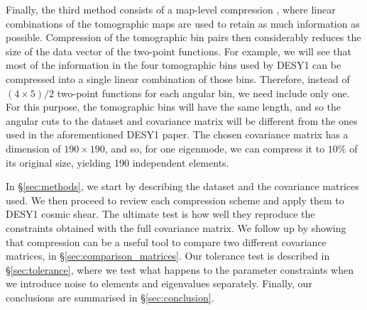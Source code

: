 \documentclass[twocolumn]{\docclass}
\newcommand{\rsec}[1]{\S\ref{sec:#1}}
\newcommand{\rssec}[1]{\S\ref{subsec:#1}}
\begin{document}
	Finally, the third method consists of a map-level compression \citep{Alonso:2017hhj}, where linear combinations of the tomographic maps are used to retain as much information as possible. Compression of the tomographic bin pairs then considerably reduces the size of the data vector of the two-point functions. For example, we will see that most of the information in the four tomographic bins used by DESY1 can be compressed into a single linear combination of those bins. Therefore, instead of $(4\times5)/2$ two-point functions for each angular bin, we need include only one.
	For this purpose, the tomographic bins will have the same length, and so the angular cuts to the dataset and covariance matrix will be different from the ones used in the aforementioned DESY1 paper. The chosen covariance matrix has a dimension of $190 \times 190$, and so, for one eigenmode, we can compress it to $10\%$ of its original size, yielding 190 independent elements.
	
	In \rsec{methods}, we start by describing the dataset and the covariance matrices used. We then proceed to review each compression scheme and apply them to DESY1 cosmic shear.  The ultimate test is how well they reproduce the constraints obtained with the full covariance matrix.
	We follow up by showing that compression can be a useful tool to compare two different covariance matrices, in \rsec{comparison_matrices}.
	Our tolerance test is described in \rsec{tolerance}, where we test what happens to the parameter constraints when we introduce noise to elements and eigenvalues separately. Finally, our conclusions are summarised in \rsec{conclusion}.
	
	
\end{document}
